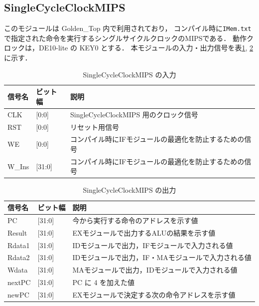 \subsection{SingleCycleClockMIPS}
このモジュールは Golden\_Top 内で利用されており，
コンパイル時に\texttt{IMem.txt}で指定された命令を実行するシングルサイクルクロックのMIPSである．
動作クロックは，DE10-lite の KEY0 とする．
本モジュールの入力・出力信号を表\ref{tab:sccm_input}, \ref{tab:sccm_output}に示す．
\begin{table}[h]
  \caption{SingleCycleClockMIPS の入力}
  \centering
  \begin{tabular}{l|l|l}
    信号名 & ビット幅 & 説明 \\
    \hline
    CLK & [0:0] & SingleCycleClockMIPS 用のクロック信号 \\
    RST & [0:0] & リセット用信号 \\
    WE & [0:0] & コンパイル時にIFモジュールの最適化を防止するための信号 \\
    W\_Ins & [31:0] & コンパイル時にIFモジュールの最適化を防止するための信号 \\
  \end{tabular}
  \label{tab:sccm_input}
\end{table}
\begin{table}[h]
  \caption{SingleCycleClockMIPS の出力}
  \centering
  \begin{tabular}{l|l|l}
    信号名 & ビット幅 & 説明 \\
    \hline
    PC & [31:0] & 今から実行する命令のアドレスを示す値 \\
    Result & [31:0] & EXモジュールで出力するALUの結果を示す値 \\
    Rdata1 & [31:0] & IDモジュールで出力，IFモジュールで入力される値 \\
    Rdata2 & [31:0] & IDモジュールで出力，IF・MAモジュールで入力される値 \\
    Wdata & [31:0] & MAモジュールで出力，IDモジュールで入力される値 \\
    nextPC & [31:0] & PC に 4 を加えた値 \\
    newPC & [31:0] & EXモジュールで決定する次の命令アドレスを示す値 \\
  \end{tabular}
  \label{tab:sccm_output}
\end{table}

